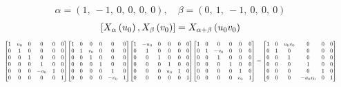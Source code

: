 \documentclass[11pt]{article}
\theoremstyle{definition}
\begin{document}
\[
\alpha = \left( 1, \  -1, \  0, \  0, \  0, \  0\right), \quad \beta = \left( 0, \  1, \  -1, \  0, \  0, \  0\right)
\]
\[
\scaletoalign{\textwidth}{\left[ X_{\alpha}\left(u_{0}\right), X_{\beta}\left(v_{0}\right) \right] = X_{\alpha + \beta}\left(u_{0} v_{0}\right)}
\]
\[
\scaletoalign{\textwidth}{{\left[\begin{matrix}1 & u_{0} & 0 & 0 & 0 & 0\\0 & 1 & 0 & 0 & 0 & 0\\0 & 0 & 1 & 0 & 0 & 0\\0 & 0 & 0 & 1 & 0 & 0\\0 & 0 & 0 & - u_{0} & 1 & 0\\0 & 0 & 0 & 0 & 0 & 1\end{matrix}\right]} {\left[\begin{matrix}1 & 0 & 0 & 0 & 0 & 0\\0 & 1 & v_{0} & 0 & 0 & 0\\0 & 0 & 1 & 0 & 0 & 0\\0 & 0 & 0 & 1 & 0 & 0\\0 & 0 & 0 & 0 & 1 & 0\\0 & 0 & 0 & 0 & - v_{0} & 1\end{matrix}\right]} {\left[\begin{matrix}1 & - u_{0} & 0 & 0 & 0 & 0\\0 & 1 & 0 & 0 & 0 & 0\\0 & 0 & 1 & 0 & 0 & 0\\0 & 0 & 0 & 1 & 0 & 0\\0 & 0 & 0 & u_{0} & 1 & 0\\0 & 0 & 0 & 0 & 0 & 1\end{matrix}\right]} {\left[\begin{matrix}1 & 0 & 0 & 0 & 0 & 0\\0 & 1 & - v_{0} & 0 & 0 & 0\\0 & 0 & 1 & 0 & 0 & 0\\0 & 0 & 0 & 1 & 0 & 0\\0 & 0 & 0 & 0 & 1 & 0\\0 & 0 & 0 & 0 & v_{0} & 1\end{matrix}\right]} = {\left[\begin{matrix}1 & 0 & u_{0} v_{0} & 0 & 0 & 0\\0 & 1 & 0 & 0 & 0 & 0\\0 & 0 & 1 & 0 & 0 & 0\\0 & 0 & 0 & 1 & 0 & 0\\0 & 0 & 0 & 0 & 1 & 0\\0 & 0 & 0 & - u_{0} v_{0} & 0 & 1\end{matrix}\right]}}
\]
\end{document}
